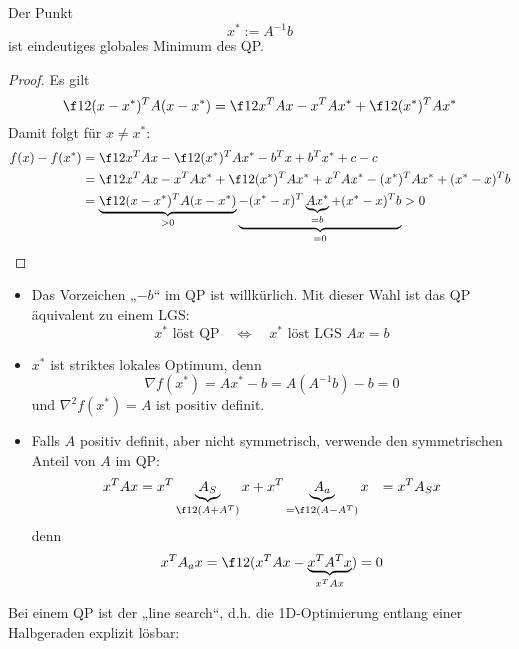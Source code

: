 \documentclass[11pt]{scrbook}
\begin{document}
\begin{st} \label{4.10}
	Der Punkt
	\[
		x^* := A^{-1} b
	\]
	ist eindeutiges globales Minimum des QP.
	\begin{proof}
		Es gilt
		\[
			\f 12 (x-x^*)^T A(x-x^*) = \f 12 x^TAx - x^TAx^* + \f 12 (x^*)^TAx^*
		\]
		Damit folgt für $x \neq x^*$:
		\begin{align*}
			f(x) - f(x^*) &= \f 12 x^T Ax - \f 12 (x^*)^TAx^* - b^Tx + b^Tx^* + c - c \\
			&= \f 12 x^T Ax - x^T Ax^* + \f 12 (x^*)^T Ax^* + x^T Ax^* - (x^*)^T Ax^* + (x^* -x)^Tb \\
			&= \underbrace{\f 12(x-x^*)^T A(x-x^*)}_{>0} \underbrace{- (x^*-x)^T\underbrace{Ax^*}_{=b} + (x^*-x)^Tb}_{=0} > 0
		\end{align*}
	\end{proof}
	\begin{note}
		\begin{itemize}
			\item
				Das Vorzeichen „$-b$“ im QP ist willkürlich.
				Mit dieser Wahl ist das QP äquivalent zu einem LGS:
				\[
					x^* \text{ löst QP} \quad \iff \quad x^* \text{ löst LGS } Ax=b
				\]
			\item
				$x^*$ ist striktes lokales Optimum, denn
				\[
					\nabla f(x^*) = Ax^* - b = A(A^{-1}b) -b = 0
				\]
				und $\nabla^2 f(x^*) = A$ ist positiv definit.
			\item
				Falls $A$ positiv definit, aber nicht symmetrisch, verwende den symmetrischen Anteil von $A$ im QP:
				\begin{align*}
					x^T A x 
					&= x^T \underbrace{A_S}_{\f 12 (A + A^T)} x + x^T \underbrace{A_a}_{= \f 12 (A-A^T)} x 
					&= x^T A_S x
				\end{align*}
				denn
				\[
					x^T A_a x = \f 12 (x^T Ax - \underbrace{x^T A^T x}_{x^T A x}) = 0
				\]
		\end{itemize}
	\end{note}
\end{st}

Bei einem QP ist der „line search“, d.h. die 1D-Optimierung entlang einer Halbgeraden explizit lösbar:
\end{document}
